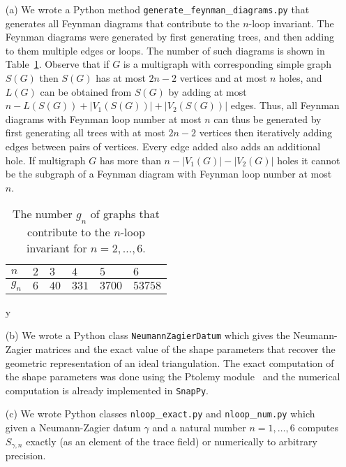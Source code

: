 \documentclass[12pt]{amsart}
\theoremstyle{definition}
\def\printname#1{
        \if\draft y
                \smash{\makebox[0pt]{\hspace{-0.5in}
                        \raisebox{8pt}{\tt\tiny #1}}}
        \fi
}
\def\lbl#1{\label{#1}\printname{#1}}
\def\ga{\gamma}
\begin{document}
\begin{itemize}
\item[(a)] 
We wrote a Python method 
\texttt{generate}\_\texttt{feynman}\_\texttt{diagrams.py}
that generates all Feynman diagrams that contribute to the $n$-loop 
invariant. The Feynman diagrams were generated by first generating trees,
and then adding to them multiple edges or loops. The number of such diagrams 
is shown in Table~\ref{t.diagrams}. 
Observe that if $G$ is a multigraph with corresponding simple graph $S(G)$ 
then $S(G)$ has at most $2n-2$ vertices and at most $n$ holes, and
$L(G)$ can be obtained from $S(G)$ by adding at most 
$n-L(S(G))+|V_1(S(G))|+|V_2(S(G))|$ edges. Thus, 
all Feynman diagrams with Feynman loop number at most $n$ can thus be 
generated by first generating all trees with at most $2n-2$ vertices then 
iteratively adding edges between pairs of vertices. Every edge added also 
adds an additional hole. If multigraph $G$ has more than $n-|V_1(G)|-|V_2(G)|$ 
holes it cannot be the subgraph of a Feynman diagram with Feynman loop 
number at most $n$. 
\begin{table}
\begin{center}
\begin{tabular}{|l||l|l|l|l|l|}\hline
 $n$ & $2$ & $3$ & $4$ & $5$ & $6$ \\ \hline
$g_n$ & $6$ & $40$ & $331$ & $3700$ & $53758$ \\ \hline
\end{tabular}\vspace{.2cm}
\caption{The number $g_n$ of graphs that contribute to the $n$-loop 
invariant for $n=2,\dots,6$.} 
\lbl{t.diagrams}
\end{center}
\end{table}
\item[(b)]
We wrote a Python class \texttt{NeumannZagierDatum} which gives the 
Neumann-Zagier matrices and the exact value of the shape parameters
that recover the geometric representation of an ideal triangulation.
The exact computation of the shape parameters was done using the Ptolemy
module~\cite{Ga:ptolemy,snappy} and the numerical computation is already
implemented in \texttt{SnapPy}.
\item[(c)]
We wrote Python classes \texttt{nloop}\_\texttt{exact.py} 
and \texttt{nloop}\_\texttt{num.py} which given a Neumann-Zagier datum $\ga$
and a natural number $n=1,\dots,6$ computes $S_{\gamma,n}$ exactly (as 
an element of the trace field) or numerically to arbitrary precision.
\end{itemize}
\end{document}
